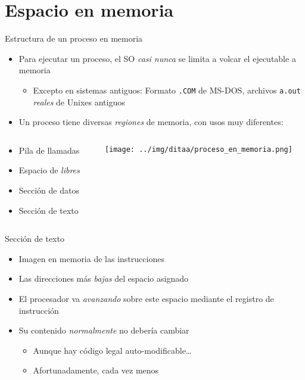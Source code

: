 \documentclass[presentation]{beamer}
\begin{document}
\section{Espacio en memoria}
\label{sec:orge662520}
\begin{frame}[label={sec:org6599151},fragile]{Estructura de un proceso en memoria}
 \begin{itemize}
\item Para ejecutar un proceso, el SO \emph{casi nunca} se limita a volcar el
ejecutable a memoria
\begin{itemize}
\item Excepto en sistemas antiguos: Formato \texttt{.COM} de MS-DOS, archivos
\texttt{a.out} \emph{reales} de Unixes antiguos
\end{itemize}
\item Un proceso tiene diversas \emph{regiones} de memoria, con usos muy
diferentes:
\end{itemize}
\begin{columns}\begin{column}{0.4\textwidth}
\begin{itemize}
\item Pila de llamadas
\item Espacio de \emph{libres}
\item Sección de datos
\item Sección de texto
\end{itemize}
\end{column}\begin{column}{0.5\textwidth}
\begin{center}
\texttt{[image: ../img/ditaa/proceso\_en\_memoria.png]}
\end{center}
\end{column}\end{columns}
\end{frame}

\begin{frame}[label={sec:org65b5e23}]{Sección de texto}
\begin{itemize}
\item Imagen en memoria de las instrucciones
\item Las direcciones más \emph{bajas} del espacio asignado
\item El procesador va \emph{avanzando} sobre este espacio mediante el
registro de instrucción
\item Su contenido \emph{normalmente} no debería cambiar
\begin{itemize}
\item Aunque hay código legal auto-modificable\ldots{}
\item Afortunadamente, cada vez menos
\end{itemize}
\end{itemize}
\end{frame}
\end{document}
